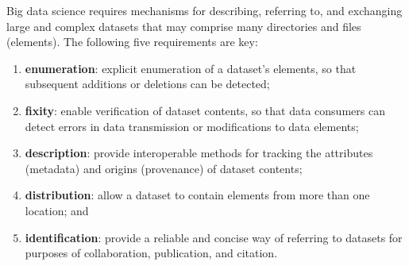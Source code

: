 \documentclass[11pt]{article}
\begin{document}
%
Big data science requires mechanisms for describing, referring to,
and exchanging large  and complex datasets that may comprise many directories and files (elements).
The following five requirements are key:
\begin{enumerate}
\item
\textbf{enumeration}: explicit enumeration of a dataset's elements, so that
subsequent additions or deletions can be detected; 
\item
\textbf{fixity}: enable verification of dataset contents, 
so that data consumers can detect errors in data transmission or modifications to data elements; 
\item
\textbf{description}: provide interoperable methods for tracking the attributes (metadata) and origins (provenance) of dataset contents; 
\item
\textbf{distribution}: allow a dataset to contain elements from more than one location; and
\item
\textbf{identification}: provide a reliable and concise way of referring to datasets for purposes of collaboration, publication, and citation.
\end{enumerate}
\end{document}

